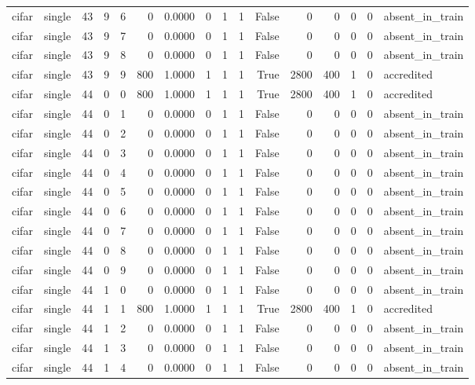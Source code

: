 \begin{tabular}{llrrrrrrrrrrrrrl}
cifar & single & 43 & 9 & 6 & 0 & 0.0000 & 0 & 1 & 1 & False & 0 & 0 & 0 & 0 & absent\_in\_train \\
cifar & single & 43 & 9 & 7 & 0 & 0.0000 & 0 & 1 & 1 & False & 0 & 0 & 0 & 0 & absent\_in\_train \\
cifar & single & 43 & 9 & 8 & 0 & 0.0000 & 0 & 1 & 1 & False & 0 & 0 & 0 & 0 & absent\_in\_train \\
cifar & single & 43 & 9 & 9 & 800 & 1.0000 & 1 & 1 & 1 & True & 2800 & 400 & 1 & 0 & accredited \\
cifar & single & 44 & 0 & 0 & 800 & 1.0000 & 1 & 1 & 1 & True & 2800 & 400 & 1 & 0 & accredited \\
cifar & single & 44 & 0 & 1 & 0 & 0.0000 & 0 & 1 & 1 & False & 0 & 0 & 0 & 0 & absent\_in\_train \\
cifar & single & 44 & 0 & 2 & 0 & 0.0000 & 0 & 1 & 1 & False & 0 & 0 & 0 & 0 & absent\_in\_train \\
cifar & single & 44 & 0 & 3 & 0 & 0.0000 & 0 & 1 & 1 & False & 0 & 0 & 0 & 0 & absent\_in\_train \\
cifar & single & 44 & 0 & 4 & 0 & 0.0000 & 0 & 1 & 1 & False & 0 & 0 & 0 & 0 & absent\_in\_train \\
cifar & single & 44 & 0 & 5 & 0 & 0.0000 & 0 & 1 & 1 & False & 0 & 0 & 0 & 0 & absent\_in\_train \\
cifar & single & 44 & 0 & 6 & 0 & 0.0000 & 0 & 1 & 1 & False & 0 & 0 & 0 & 0 & absent\_in\_train \\
cifar & single & 44 & 0 & 7 & 0 & 0.0000 & 0 & 1 & 1 & False & 0 & 0 & 0 & 0 & absent\_in\_train \\
cifar & single & 44 & 0 & 8 & 0 & 0.0000 & 0 & 1 & 1 & False & 0 & 0 & 0 & 0 & absent\_in\_train \\
cifar & single & 44 & 0 & 9 & 0 & 0.0000 & 0 & 1 & 1 & False & 0 & 0 & 0 & 0 & absent\_in\_train \\
cifar & single & 44 & 1 & 0 & 0 & 0.0000 & 0 & 1 & 1 & False & 0 & 0 & 0 & 0 & absent\_in\_train \\
cifar & single & 44 & 1 & 1 & 800 & 1.0000 & 1 & 1 & 1 & True & 2800 & 400 & 1 & 0 & accredited \\
cifar & single & 44 & 1 & 2 & 0 & 0.0000 & 0 & 1 & 1 & False & 0 & 0 & 0 & 0 & absent\_in\_train \\
cifar & single & 44 & 1 & 3 & 0 & 0.0000 & 0 & 1 & 1 & False & 0 & 0 & 0 & 0 & absent\_in\_train \\
cifar & single & 44 & 1 & 4 & 0 & 0.0000 & 0 & 1 & 1 & False & 0 & 0 & 0 & 0 & absent\_in\_train \\

\end{tabular}

